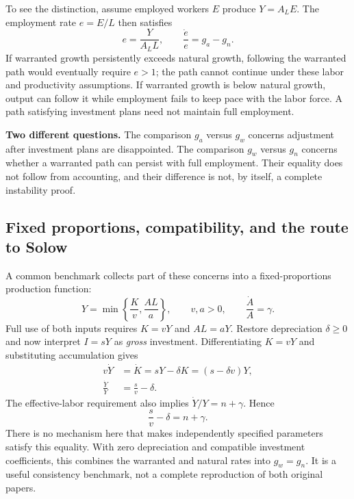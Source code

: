 To see the distinction, assume employed workers $E$ produce $Y=A_LE$.
The employment rate $e=E/L$ then satisfies
\begin{equation}
e=\frac{Y}{A_LL},\qquad \frac{\dot e}{e}=g_a-g_n.
\end{equation}
If warranted growth persistently exceeds natural growth, following the
warranted path would eventually require $e>1$; the path cannot continue under
these labor and productivity assumptions. If warranted growth is below natural
growth, output can follow it while employment fails to keep pace with the labor
force. A path satisfying investment plans need not maintain full employment.

\begin{greenblock}
\textbf{Two different questions.}
The comparison $g_a$ versus $g_w$ concerns adjustment after investment plans are
disappointed. The comparison $g_w$ versus $g_n$ concerns whether a warranted
path can persist with full employment. Their equality does not follow from
accounting, and their difference is not, by itself, a complete instability proof.
\end{greenblock}

\subsection{Fixed proportions, compatibility, and the route to Solow}

A common benchmark collects part of these concerns into a fixed-proportions
production function:
\begin{equation}
Y=\min\left\{\frac{K}{v},\frac{AL}{a}\right\},\qquad v,a>0,
\qquad \frac{\dot A}{A}=\gamma.
\end{equation}
Full use of both inputs requires $K=vY$ and $AL=aY$. Restore depreciation
$\delta\geq0$ and now interpret $I=sY$ as \emph{gross} investment. Differentiating
$K=vY$ and substituting accumulation gives
\begin{align}
v\dot Y&=\dot K=sY-\delta K=(s-\delta v)Y,\\
\frac{\dot Y}{Y}&=\frac{s}{v}-\delta.
\end{align}
The effective-labor requirement also implies $\dot Y/Y=n+\gamma$. Hence
\begin{equation}\label{eq:hd-compatibility}
\frac{s}{v}-\delta=n+\gamma.
\end{equation}
There is no mechanism here that makes independently specified parameters
satisfy this equality. With zero depreciation and compatible investment
coefficients, this combines the warranted and natural rates into $g_w=g_n$.
It is a useful consistency benchmark, not a complete reproduction of both
original papers.

